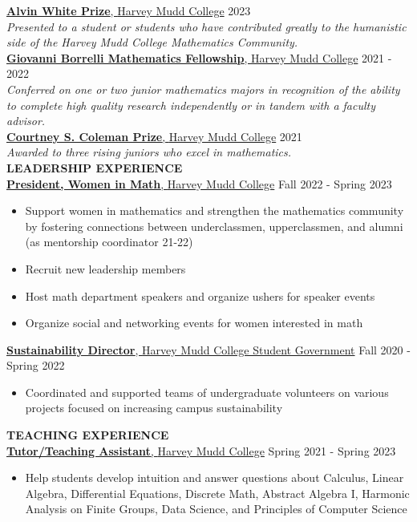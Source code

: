 \documentclass[11pt]{article}
\newcommand{\hdr}[1]{\textcolor{blue(ryb)}{\textbf{#1}}}
\newcommand{\role}[3]{\underline{\textbf{#1}, {#2}} \hfill #3}
\begin{document}
\role{Alvin White Prize}{Harvey Mudd College}{2023}\\
\textit{Presented to a student or students who have contributed greatly to the humanistic side of the Harvey Mudd College Mathematics Community.}\\
\role{Giovanni Borrelli Mathematics Fellowship}{Harvey Mudd College}{2021 - 2022}\\
\textit{Conferred on one or two junior mathematics majors in recognition of the ability to complete high quality research independently or in tandem with a faculty advisor.}\\
\role{Courtney S. Coleman Prize}{Harvey Mudd College}{2021}\\
\textit{Awarded to three rising juniors who excel in mathematics.}\\
\hdr{LEADERSHIP EXPERIENCE}\\
\role{President, Women in Math}{Harvey Mudd College}{Fall 2022 - Spring 2023}
\begin{itemize}
\item Support women in mathematics and strengthen the mathematics community by fostering connections between underclassmen, upperclassmen, and alumni (as mentorship coordinator 21-22)
\item Recruit new leadership members
\item Host math department speakers and organize ushers for speaker events
\item Organize social and networking events for women interested in math
\end{itemize}
\smallskip
\role{Sustainability Director}{Harvey Mudd College Student Government}{Fall 2020 - Spring 2022}
\begin{itemize}
\item Coordinated and supported teams of undergraduate volunteers on various projects focused on increasing campus sustainability
\end{itemize}
\newpage
\hdr{TEACHING EXPERIENCE}\\
\role{Tutor/Teaching Assistant}{Harvey Mudd College}{Spring 2021 - Spring 2023}
\begin{itemize}
\item Help students develop intuition and answer questions about Calculus, Linear Algebra, Differential Equations, Discrete Math, Abstract Algebra I, Harmonic Analysis on Finite Groups, Data Science, and Principles of Computer Science
\end{itemize}
\end{document}
